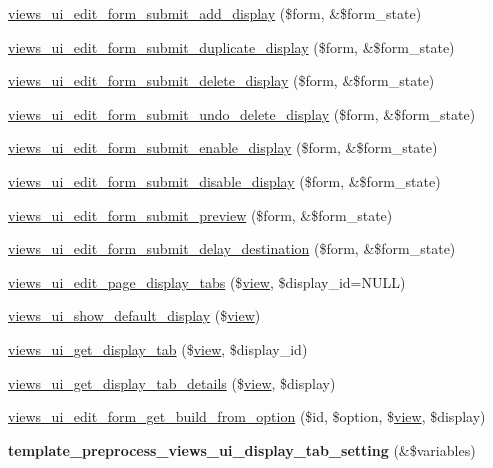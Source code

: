 \begin{DoxyCompactItemize}
\item 
\hyperlink{admin_8inc_a640f7e7b2468e31bdd95e808890c4849}{views\_\-ui\_\-edit\_\-form\_\-submit\_\-add\_\-display} (\$form, \&\$form\_\-state)
\item 
\hyperlink{admin_8inc_ae053ac5c2b462e488e968d3e3ba78141}{views\_\-ui\_\-edit\_\-form\_\-submit\_\-duplicate\_\-display} (\$form, \&\$form\_\-state)
\item 
\hyperlink{admin_8inc_a2a91bd9b0b437cb348845844f33fca99}{views\_\-ui\_\-edit\_\-form\_\-submit\_\-delete\_\-display} (\$form, \&\$form\_\-state)
\item 
\hyperlink{admin_8inc_a82b6d7468aa9a3c2d86126ea0e61ec9f}{views\_\-ui\_\-edit\_\-form\_\-submit\_\-undo\_\-delete\_\-display} (\$form, \&\$form\_\-state)
\item 
\hyperlink{admin_8inc_af7a13d0c2cd085c0bf2486c1ded3b445}{views\_\-ui\_\-edit\_\-form\_\-submit\_\-enable\_\-display} (\$form, \&\$form\_\-state)
\item 
\hyperlink{admin_8inc_a59671db7ec1186790dd4bccbdf913a8c}{views\_\-ui\_\-edit\_\-form\_\-submit\_\-disable\_\-display} (\$form, \&\$form\_\-state)
\item 
\hyperlink{admin_8inc_a8263cbb4980efaa11823aae67bce1e26}{views\_\-ui\_\-edit\_\-form\_\-submit\_\-preview} (\$form, \&\$form\_\-state)
\item 
\hyperlink{admin_8inc_a7f49b3c4b67b54e5bd82cbe7406f8eb4}{views\_\-ui\_\-edit\_\-form\_\-submit\_\-delay\_\-destination} (\$form, \&\$form\_\-state)
\item 
\hyperlink{admin_8inc_af68377c9cd423a44378278947ce082c0}{views\_\-ui\_\-edit\_\-page\_\-display\_\-tabs} (\$\hyperlink{classview}{view}, \$display\_\-id=NULL)
\item 
\hyperlink{admin_8inc_a12ff546b37d157b29b5aa22318fdfdaf}{views\_\-ui\_\-show\_\-default\_\-display} (\$\hyperlink{classview}{view})
\item 
\hyperlink{admin_8inc_a260d67b28a279ec95f4222eca0137bb1}{views\_\-ui\_\-get\_\-display\_\-tab} (\$\hyperlink{classview}{view}, \$display\_\-id)
\item 
\hyperlink{admin_8inc_ac85eb125b7c9a2a81bd2b5a0578dc587}{views\_\-ui\_\-get\_\-display\_\-tab\_\-details} (\$\hyperlink{classview}{view}, \$display)
\item 
\hyperlink{admin_8inc_ac3afa3d1dfc328770b843c2127a2f9f8}{views\_\-ui\_\-edit\_\-form\_\-get\_\-build\_\-from\_\-option} (\$id, \$option, \$\hyperlink{classview}{view}, \$display)
\item 
\hypertarget{admin_8inc_a7e664727cd6b87878a1d7c6628c26db3}{
{\bfseries template\_\-preprocess\_\-views\_\-ui\_\-display\_\-tab\_\-setting} (\&\$variables)}
\label{admin_8inc_a7e664727cd6b87878a1d7c6628c26db3}


\end{DoxyCompactItemize}
